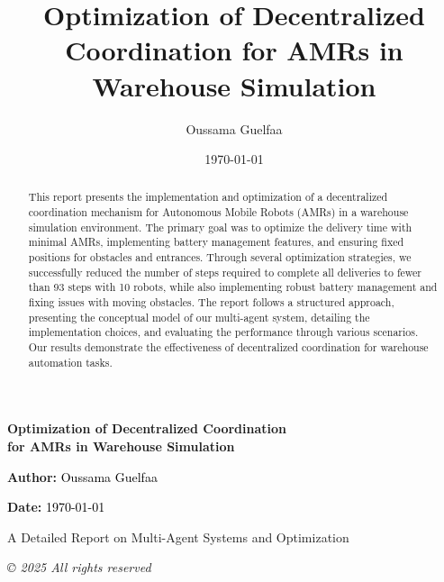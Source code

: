 \documentclass[12pt,a4paper]{article}
\title{\textbf{\textcolor{blue!60!black}{\LARGE Optimization of Decentralized Coordination for AMRs in Warehouse Simulation}}}
\author{\textcolor{gray!90!black}{\Large Oussama Guelfaa}}
\date{\textcolor{gray!90!black}{\today}}
\begin{document}
\thispagestyle{coverstyle}
\begin{titlepage}
    \centering
    \vspace*{2cm}


    \vspace{1.5cm}
    {\Huge \bfseries \textcolor{blue!60!black}{Optimization of Decentralized Coordination}\\[0.3em]
    \textcolor{blue!60!black}{for AMRs in Warehouse Simulation}\par}
    \vspace{1.5cm}
    {\Large \textcolor{gray!60!black}{\textbf{Author:}} \textcolor{black}{Oussama Guelfaa} \par}
    \vspace{1cm}
    {\Large \textcolor{gray!60!black}{\textbf{Date:}} \textcolor{black}{\today}\par}
    
    \vfill
    \textcolor{gray!70!black}{\Large A Detailed Report on Multi-Agent Systems and Optimization}
    \vspace{2cm}
    
    \textcolor{black!80}{\small \emph{© 2025 All rights reserved}}
\end{titlepage}
\clearpage

\pagestyle{plain}

\begin{abstract}
\noindent
This report presents the implementation and optimization of a decentralized coordination mechanism for Autonomous Mobile Robots (AMRs) in a warehouse simulation environment. The primary goal was to optimize the delivery time with minimal AMRs, implementing battery management features, and ensuring fixed positions for obstacles and entrances. Through several optimization strategies, we successfully reduced the number of steps required to complete all deliveries to fewer than 93 steps with 10 robots, while also implementing robust battery management and fixing issues with moving obstacles. The report follows a structured approach, presenting the conceptual model of our multi-agent system, detailing the implementation choices, and evaluating the performance through various scenarios. Our results demonstrate the effectiveness of decentralized coordination for warehouse automation tasks.
\end{abstract}
\end{document}
